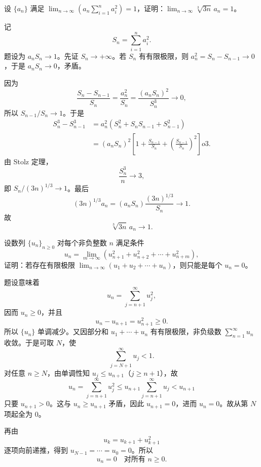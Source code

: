 \begin{xreferenceproblem}[8]
设 $\{a_n\}$ 满足 $\displaystyle\lim_{n\to\infty}\left(a_n\sum_{i=1}^n a_i^2\right)=1$，证明：$\displaystyle\lim_{n\to\infty}\sqrt[3]{3n}\,a_n=1$。
\end{xreferenceproblem}
\begin{xsolution}
记
\[
  S_n=\sum_{i=1}^n a_i^2.
\]
题设为 $a_nS_n\to1$。先证 $S_n\to+\infty$。若 $S_n$ 有有限极限，则 $a_n^2=S_n-S_{n-1}\to0$，于是 $a_nS_n\to0$，矛盾。

因为
\[
  \frac{S_n-S_{n-1}}{S_n}=\frac{a_n^2}{S_n}
  =\frac{(a_nS_n)^2}{S_n^3}\to0,
\]
所以 $S_{n-1}/S_n\to1$。于是
\begin{align*}
  S_n^3-S_{n-1}^3
  &=a_n^2(S_n^2+S_nS_{n-1}+S_{n-1}^2)\\
  &=(a_nS_n)^2\left[1+\frac{S_{n-1}}{S_n}
     +\left(\frac{S_{n-1}}{S_n}\right)^2\right]	o3.
\end{align*}
由 Stolz 定理，
\[
  \frac{S_n^3}{n}\to3,
\]
即 $S_n/(3n)^{1/3}\to1$。最后
\[
  (3n)^{1/3}a_n
  =(a_nS_n)\frac{(3n)^{1/3}}{S_n}\to1.
\]
故
\[
  \boxed{\sqrt[3]{3n}\,a_n\to1}.
\]
\end{xsolution}


\begin{xreferenceproblem}[9]
设数列 $\{u_n\}_{n\ge0}$ 对每个非负整数 $n$ 满足条件
  \[
    u_n=\lim_{m\to\infty}(u_{n+1}^2+u_{n+2}^2+\cdots+u_{n+m}^2),
  \]
  证明：若存在有限极限 $\displaystyle\lim_{n\to\infty}(u_1+u_2+\cdots+u_n)$，则只能是每个 $u_n=0$。
\end{xreferenceproblem}
\begin{xsolution}
题设意味着
\[
  u_n=\sum_{j=n+1}^{\infty}u_j^2,
\]
因而 $u_n\ge0$，并且
\[
  u_n-u_{n+1}=u_{n+1}^2\ge0.
\]
所以 $\{u_n\}$ 单调减少。又因部分和 $u_1+\cdots+u_n$ 有有限极限，非负级数 $\sum_{n=1}^{\infty}u_n$ 收敛。于是可取 $N$，使
\[
  \sum_{j=N+1}^{\infty}u_j<1.
\]
对任意 $n\ge N$，由单调性知 $u_j\le u_{n+1}$（$j\ge n+1$），故
\[
  u_n=\sum_{j=n+1}^{\infty}u_j^2
  \le u_{n+1}\sum_{j=n+1}^{\infty}u_j
  <u_{n+1}
\]
只要 $u_{n+1}>0$。这与 $u_n\ge u_{n+1}$ 矛盾，因此 $u_{n+1}=0$，进而 $u_n=0$。故从第 $N$ 项起全为 $0$。

再由
\[
  u_k=u_{k+1}+u_{k+1}^2
\]
逐项向前递推，得到 $u_{N-1}=\cdots=u_0=0$。所以
\[
  \boxed{u_n=0\quad\text{对所有 }n\ge0}.
\]
\end{xsolution}



